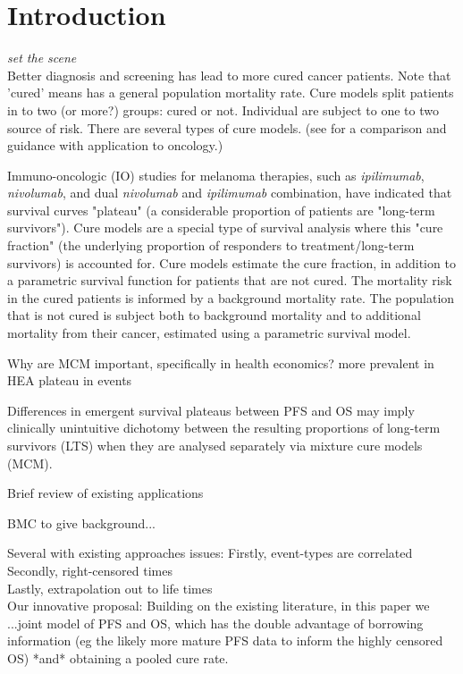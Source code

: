 \documentclass[AMA,STIX1COL]{WileyNJD-v2}
\begin{document}


\section{Introduction}\label{sec:intro}

{\it set the scene}\\
Better diagnosis and screening has lead to more cured cancer patients.
Note that 'cured' means has a general population mortality rate.
Cure models split patients in to two (or more?) groups: cured or not.
Individual are subject to one to two source of risk.
There are several types of cure models.
(see \cite{Yu2013} for a comparison and guidance with application to oncology.)


Immuno-oncologic (IO) studies for melanoma therapies, such as {\it ipilimumab}, {\it nivolumab}, and dual {\it nivolumab} and {\it ipilimumab} combination,
have indicated that survival curves "plateau" (a considerable proportion of patients are "long-term survivors").
Cure models are a special type of survival analysis where this "cure fraction" (the underlying proportion of responders to treatment/long-term survivors) is accounted for.
Cure models estimate the cure fraction, in addition to a parametric survival function for patients that are not cured.
The mortality risk in the cured patients is informed by a background mortality rate.
The population that is not cured is subject both to background mortality and to additional mortality from their cancer, estimated using a parametric survival model.
\cite{Amico2018}

Why are MCM important, specifically in health economics?
more prevalent in HEA
plateau in events

Differences in emergent survival plateaus between PFS and OS may imply clinically unintuitive dichotomy between the resulting proportions of long-term survivors (LTS) when they are analysed separately via mixture cure models (MCM).

Brief review of existing applications


BMC to give background...

Several with existing approaches issues:
Firstly, event-types are correlated\\
Secondly, right-censored times\\
Lastly, extrapolation out to life times\\

Our innovative proposal:
Building on the existing literature, in this paper we ...joint model of PFS and OS, which has the double advantage of borrowing information
(eg the likely more mature PFS data to inform the highly censored OS)
*and* obtaining a pooled cure rate.
\end{document}
